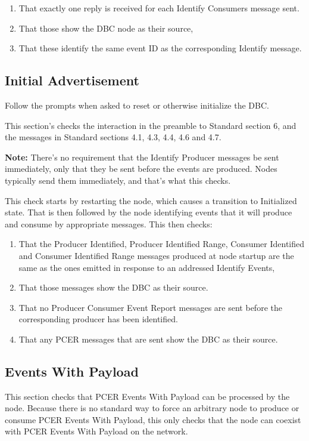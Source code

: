 \begin{enumerate}
\item That exactly one reply is received for each Identify Consumers message sent.
\item That those show the DBC node as their source,
\item That these identify the same event ID as the corresponding Identify message.
\end{enumerate}

\subsection{Initial Advertisement}

Follow the prompts when asked to reset or otherwise initialize the DBC.

This section's checks the interaction in the preamble to Standard section 6, and
the messages in Standard sections 4.1, 4.3, 4.4, 4.6 and 4.7.

\textbf{Note:}  There's no requirement that the Identify Producer messages
be sent immediately, only that they be sent before the events are produced.
Nodes typically send them immediately, and that's what this checks.

This check starts by restarting the node, which causes a transition to Initialized
state.  That is then followed by the node identifying events that it will 
produce and consume by appropriate messages. This then checks:

\begin{enumerate}
\item That the Producer Identified, Producer Identified Range, Consumer Identified 
    and Consumer Identified Range messages produced at node startup are the same
    as the ones emitted in response to an addressed Identify Events,
\item That those messages show the DBC as their source.
\item That no Producer Consumer Event Report messages are sent before the 
    corresponding producer has been identified.
\item That any PCER messages that are sent show the DBC as their source.
\end{enumerate}

\subsection{Events With Payload}

This section checks that PCER Events With Payload can be processed by 
the node. Because there is no standard way to force an arbitrary
node to produce or consume PCER Events With Payload, this only checks
that the node can coexist with PCER Events With Payload on the network.


